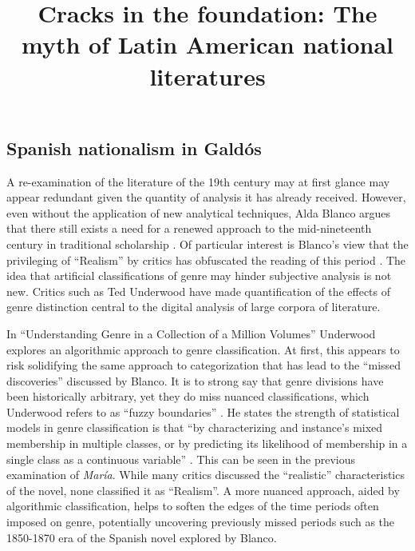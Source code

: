 \documentclass[12pt]{report}
\title{Cracks in the foundation: The myth of Latin American national literatures}
\begin{document}

\begin{singlespace}
	\chapter{Spanish nationalism in Galdós}
\end{singlespace}

A re-examination of the literature of the 19th century may at first glance may appear redundant given the quantity of analysis it has already received. 
However, even without the application of new analytical techniques, Alda Blanco argues that there still exists a need for a renewed approach to the mid-nineteenth century in traditional scholarship \cite[423]{Blanco2000}.
Of particular interest is Blanco's view that the privileging of \enquote{Realism} by critics has obfuscated the reading of this period \cite[433]{Blanco2000}.
The idea that artificial classifications of genre may hinder subjective analysis is not new.
Critics such as Ted Underwood have made quantification of the effects of genre distinction central to the digital analysis of large corpora of literature. 


In \enquote{Understanding Genre in a Collection of a Million Volumes} Underwood explores an algorithmic approach to genre classification. 
At first, this appears to risk solidifying the same approach to categorization that has lead to the \enquote{missed discoveries} discussed by Blanco.
It is to strong say that genre divisions have been historically arbitrary, yet they do miss nuanced classifications, which Underwood refers to as \enquote{fuzzy boundaries} \cite[9]{Underwood2014}.
He states the strength of statistical models in genre classification is that \enquote{by characterizing and instance's mixed membership in multiple classes, or by predicting its likelihood of membership in a single class as a continuous variable} \cite[9]{Underwood2014}.
This can be seen in the previous examination of \textit{María}.
While many critics discussed the \enquote{realistic} characteristics of the novel, none classified it as \enquote{Realism}.
A more nuanced approach, aided by algorithmic classification, helps to soften the edges of the time periods often imposed on genre, potentially uncovering previously missed periods such as the 1850-1870 era of the Spanish novel explored by Blanco.
\end{document}
